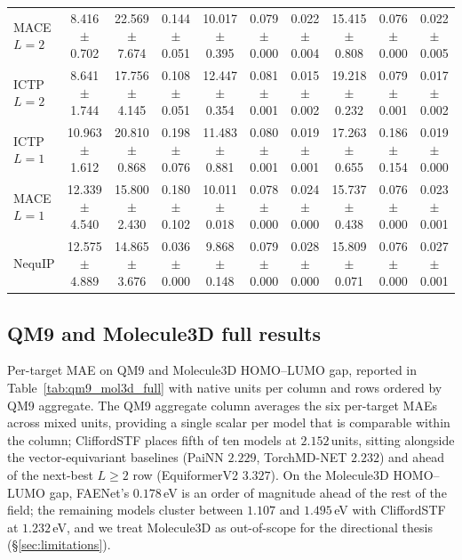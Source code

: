 \begin{table}[h]
{\begin{tabular}{lccccccccc}
MACE $L{=}2$ & 8.416 $\pm$ 0.702 & 22.569 $\pm$ 7.674 & 0.144 $\pm$ 0.051 & 10.017 $\pm$ 0.395 & 0.079 $\pm$ 0.000 & 0.022 $\pm$ 0.004 & 15.415 $\pm$ 0.808 & 0.076 $\pm$ 0.000 & 0.022 $\pm$ 0.005 \\
ICTP $L{=}2$ & 8.641 $\pm$ 1.744 & 17.756 $\pm$ 4.145 & 0.108 $\pm$ 0.051 & 12.447 $\pm$ 0.354 & 0.081 $\pm$ 0.001 & 0.015 $\pm$ 0.002 & 19.218 $\pm$ 0.232 & 0.079 $\pm$ 0.001 & 0.017 $\pm$ 0.002 \\
ICTP $L{=}1$ & 10.963 $\pm$ 1.612 & 20.810 $\pm$ 0.868 & 0.198 $\pm$ 0.076 & 11.483 $\pm$ 0.881 & 0.080 $\pm$ 0.001 & 0.019 $\pm$ 0.001 & 17.263 $\pm$ 0.655 & 0.186 $\pm$ 0.154 & 0.019 $\pm$ 0.000 \\
MACE $L{=}1$ & 12.339 $\pm$ 4.540 & 15.800 $\pm$ 2.430 & 0.180 $\pm$ 0.102 & 10.011 $\pm$ 0.018 & 0.078 $\pm$ 0.000 & 0.024 $\pm$ 0.000 & 15.737 $\pm$ 0.438 & 0.076 $\pm$ 0.000 & 0.023 $\pm$ 0.001 \\
NequIP & 12.575 $\pm$ 4.889 & 14.865 $\pm$ 3.676 & 0.036 $\pm$ 0.000 & 9.868 $\pm$ 0.148 & 0.079 $\pm$ 0.000 & 0.028 $\pm$ 0.000 & 15.809 $\pm$ 0.071 & 0.076 $\pm$ 0.000 & 0.027 $\pm$ 0.001 \\
\bottomrule
\end{tabular}%
}
\end{table}
 

\subsection{QM9 and Molecule3D full results}\label{supp:qm9_full}

Per-target MAE on QM9 and Molecule3D HOMO--LUMO gap, reported in Table~\ref{tab:qm9_mol3d_full} with native units per column and rows ordered by QM9 aggregate. The QM9 aggregate column averages the six per-target MAEs across mixed units, providing a single scalar per model that is comparable within the column; CliffordSTF places fifth of ten models at $2.152$\,units, sitting alongside the vector-equivariant baselines (PaiNN $2.229$, TorchMD-NET $2.232$) and ahead of the next-best $L\!\geq\!2$ row (EquiformerV2 $3.327$). On the Molecule3D HOMO--LUMO gap, FAENet's $0.178$\,eV is an order of magnitude ahead of the rest of the field; the remaining models cluster between $1.107$ and $1.495$\,eV with CliffordSTF at $1.232$\,eV, and we treat Molecule3D as out-of-scope for the directional thesis (\S\ref{sec:limitations}).

